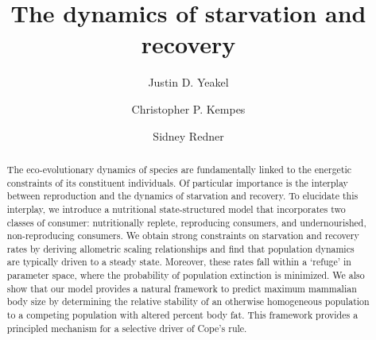 \documentclass[twocolumn,preprintnumbers,amsmath,amssymb,superscriptaddress]{revtex4}
\begin{document}
\author{Justin D. Yeakel} 

\author{Christopher P. Kempes} 

\author{Sidney Redner} 

\title{The dynamics of starvation and recovery}%



\begin{abstract} %
The eco-evolutionary dynamics of species are fundamentally linked to the energetic constraints of its constituent individuals. Of particular importance is the interplay between reproduction and the dynamics of starvation and recovery. To elucidate this interplay, we introduce a nutritional state-structured model that incorporates two classes of consumer: nutritionally replete, reproducing consumers, and undernourished, non-reproducing consumers. We obtain strong constraints on starvation and recovery rates by deriving allometric scaling relationships and find that population dynamics are typically driven to a steady state. Moreover, these rates fall within a `refuge' in parameter space, where the probability of population extinction is minimized. We also show that our model provides a natural framework to predict maximum mammalian body size by determining the relative stability of an otherwise homogeneous population to a competing population with altered percent body fat. This framework provides a principled mechanism for a selective driver of Cope's rule.
\end{abstract}

\maketitle
\end{document}
